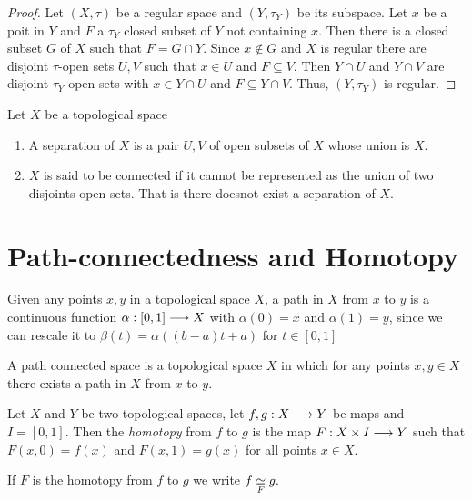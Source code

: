 \begin{proof}
    Let $(X, \tau)$ be a regular space and $(Y, \tau_Y)$ be its subspace. Let $x$ be a poit in $Y$ and $F$ a $\tau_Y$ closed subset of $Y$ not containing $x$. Then there is a closed subset $G$ of $X$ such that $F  = G \cap Y$. Since $x \notin G$ and $X$ is regular there are disjoint $\tau$-open sets $U, V$ such that $x \in U$ and $F \subseteq V$. Then $Y \cap U$ and $Y \cap V$ are disjoint $\tau_Y$ open sets with $x \in Y \cap U$ and $F \subseteq Y \cap V$. Thus, $(Y, \tau_Y)$ is regular.
\end{proof}

\begin{defn}
    Let $X$ be a topological space 
    \begin{enumerate}
        \item A separation of $X$ is a pair $U,V$ of open subsets of $X$ whose union is $X$.
        \item $X$ is said to be connected if it cannot be represented as the union of two disjoints open sets. That is there doesnot exist a separation of $X$.
    \end{enumerate}
\end{defn}

\section{Path-connectedness and Homotopy}

\begin{defn}[Path]
    Given any points $x,y$ in a topological space $X$, a path in $X$ from $x$ to $y$ is a continuous function $\alpha : [0,1] \longrightarrow X$ with $\alpha(0) = x$ and $\alpha(1) = y$, since we can rescale it to $\beta(t) = \alpha((b-a)t + a)$ for $t \in [0,1]$
\end{defn}
\begin{defn}
    A path connected space is a topological space $X$ in which for any points $x,y \in X$ there exists a path in $X$ from $x$ to $y$.
\end{defn}

\begin{defn}[Homotopy]
Let $X$ and $Y$ be two topological spaces, let $f,g : X \longrightarrow Y$ be maps and $I = [0,1]$. Then the \textit{homotopy} from $f$ to $g$ is the map $F: X \times I \longrightarrow Y$ such that $F(x,0) = f(x)$ and $F(x,1) = g(x)$ for all points $x \in X$.
\end{defn}

\begin{notn}
If $F$ is the homotopy from $f$ to $g$ we write $\displaystyle f \underset{F}{\simeq} g.$
\end{notn}

